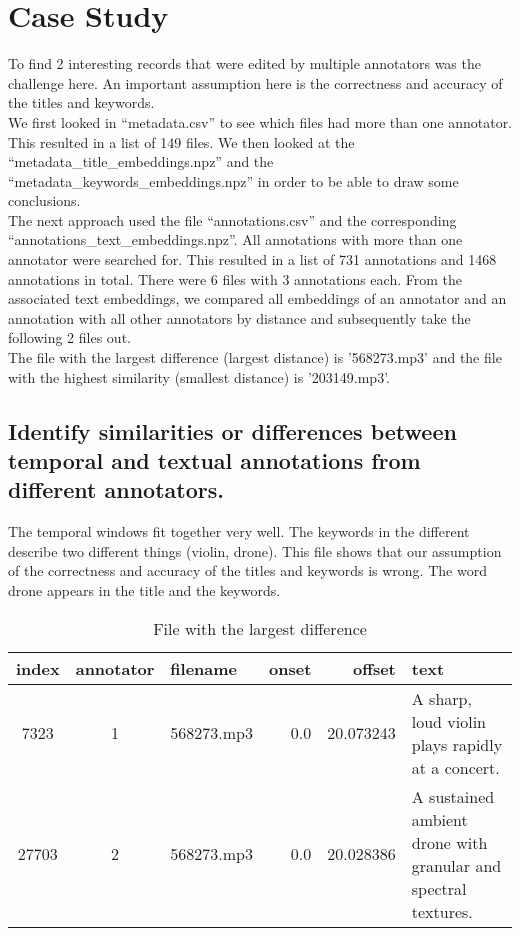 
\section{Case Study}
\label{sec:Case Study}

To find 2 interesting records that were edited by multiple annotators was the challenge here. 
An important assumption here is the correctness and accuracy of the titles and keywords. \\
We first looked in ``metadata.csv'' to see which files had more than one annotator. 
This resulted in a list of 149 files. 
We then looked at the ``metadata\_title\_embeddings.npz'' and the ``metadata\_keywords\_embeddings.npz'' in order 
to be able to draw some conclusions. \\
The next approach used the file ``annotations.csv'' and the corresponding ``annotations\_text\_embeddings.npz''. 
All annotations with more than one annotator were searched for. 
This resulted in a list of 731 annotations and 1468 annotations in total. There were 6 files with 3 annotations each. 
From the associated text embeddings, we compared all embeddings of an annotator and an annotation with all other annotators by distance and 
subsequently take the following 2 files out. \\
The file with the largest difference (largest distance) is '568273.mp3' and the file with the highest similarity (smallest distance) is '203149.mp3'.

\subsection{Identify similarities or differences between temporal and textual annotations from different annotators.}
\label{sec:Case Study:a}

The temporal windows fit together very well. The keywords in the different describe two different things (violin, drone).
This file shows that our assumption of the correctness and accuracy of the titles and keywords is wrong. 
The word drone appears in the title and the keywords.

\begin{table}[h]
  \caption{File with the largest difference}
  \label{tab:largest difference}
  \centering
  \begin{tabular}{cclrrp{6cm}}
    \toprule
    index & annotator & filename & onset & offset & text \\
    \midrule
    7323 & 1 & 568273.mp3 & 0.0 & 20.073243 & A sharp, loud violin plays rapidly at a concert. \\
    27703 & 2 & 568273.mp3 & 0.0 & 20.028386 & A sustained ambient drone with granular and spectral textures. \\
    \bottomrule
  \end{tabular}
\end{table}

